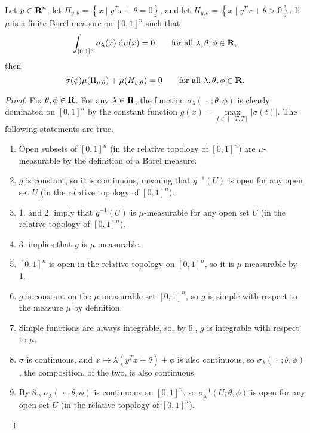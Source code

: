 \documentclass{homework}
\begin{document}
	\question
	\newcommand{\zset}{\Pi_{y,\theta}}
	\newcommand{\pset}{H_{y,\theta}}
	Let $y \in \textbf{R}^n$, let $\zset = \left\{x\mid y^Tx + \theta = 0\right\}$, and let $\pset=\left\{x\mid y^Tx+\theta > 0\right\}$. If $\mu$ is a finite Borel measure on $[0,1]^n$ such that
	\begin{equation}
		\label{eq:mu_zero_cond}
		\int_{[0,1]^n}\sigma_\lambda(x)\;\text{d}\mu(x) = 0 \qquad \text{for all } \lambda, \theta, \phi\in\textbf{R},
	\end{equation}
	then
	\begin{equation}
		\sigma(\phi)\mu(\zset) + \mu(\pset) = 0\qquad \text{for all } \lambda, \theta, \phi\in\R.
	\end{equation}
	\begin{proof}
		Fix $\theta,\phi\in\textbf{R}$. For any $\lambda \in \textbf{R}$, the function $\sigma_\lambda(\,\cdot\,;\theta,\phi)$ is clearly dominated on $[0,1]^n$ by the constant function $g(x) = \max\limits_{t\in[-T,T]}|\sigma(t)|$. The following statements are true.
		\begin{enumerate}
			\item Open subsets of $[0,1]^n$ (in the relative topology of $[0,1]^n$) are $\mu$-measurable by the definition of a Borel measure.
			\item $g$ is constant, so it is continuous, meaning that $g^{-1}(U)$ is open for any open set $U$ (in the relative topology of $[0,1]^n$).
			\item 1. and 2. imply that $g^{-1}(U)$ is $\mu$-measurable for any open set $U$ (in the relative topology of $[0,1]^n$).
			\item 3. implies that $g$ is $\mu$-measurable.
			\item $[0,1]^n$ is open in the relative topology on $[0,1]^n$, so it is $\mu$-measurable by 1.
			\item $g$ is constant on the $\mu$-measurable set $[0,1]^n$, so $g$ is simple with respect to the measure $\mu$ by definition.
			\item Simple functions are always integrable, so, by 6., $g$ is integrable with respect to $\mu$.
			\item $\sigma$ is continuous, and $x\mapsto\lambda (y^Tx + \theta) + \phi$ is also continuous, so $\sigma_\lambda(\,\cdot\,;\theta,\phi)$, the composition, of the two, is also continuous.
			\item By 8., $\sigma_\lambda(\,\cdot\,;\theta,\phi)$ is continuous on $[0,1]^n$, so $\sigma_\lambda^{-1}(U;\theta,\phi)$ is open for any open set $U$ (in the relative topology of $[0,1]^n$).

\end{enumerate}
\end{proof}
\end{document}
